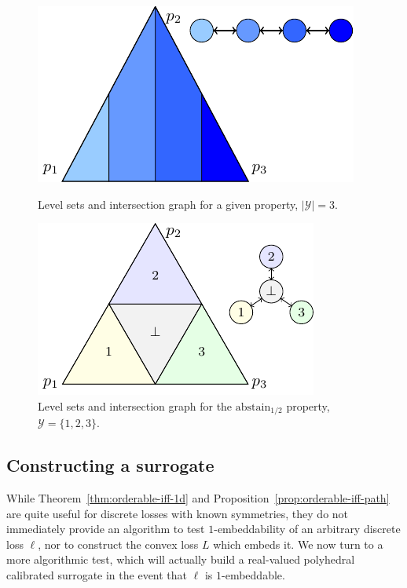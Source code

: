 \documentclass[anon]{colt2020} %
\newcommand{\abstain}[1]{\mathrm{abstain}_{#1}}
\newcommand{\Y}{\mathcal{Y}}
\begin{document}
\begin{figure}
	\begin{minipage}{0.48\linewidth}
	\centering
	\includegraphics[width = 0.7\linewidth]{tikz/intersection-graph.pdf}
	\caption{Level sets and intersection graph for a given property, $|\Y| = 3$.}
	\label{fig:intersection-graph-ex}
	\end{minipage}
\hfill
	\begin{minipage}{0.48\linewidth}
	\centering
	\includegraphics[width = 0.7\linewidth]{tikz/abstain-alpha-half.pdf}
	\caption{Level sets and intersection graph for the $\abstain{1/2}$ property, $\Y = \{1,2,3\}$.}
	\label{fig:abstain-alpha-half}
\end{minipage}
\end{figure}

\subsection{Constructing a surrogate}
While Theorem~\ref{thm:orderable-iff-1d} and Proposition~\ref{prop:orderable-iff-path} are quite useful for discrete losses with known symmetries, they do not immediately provide an algorithm to test $1$-embeddability of an arbitrary discrete loss $\ell$, nor to construct the convex loss $L$ which embeds it.
We now turn to a more algorithmic test, which will actually build a real-valued polyhedral calibrated surrogate in the event that $\ell$ is $1$-embeddable.
\end{document}
